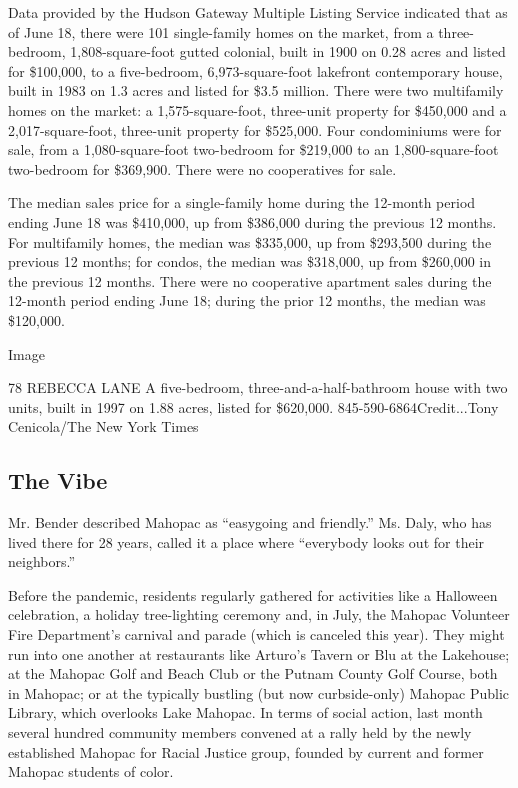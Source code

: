 Data provided by the Hudson Gateway Multiple Listing Service indicated
that as of June 18, there were 101 single-family homes on the market,
from a three-bedroom, 1,808-square-foot gutted colonial, built in 1900
on 0.28 acres and listed for \$100,000, to a five-bedroom,
6,973-square-foot lakefront contemporary house, built in 1983 on 1.3
acres and listed for \$3.5 million. There were two multifamily homes on
the market: a 1,575-square-foot, three-unit property for \$450,000 and a
2,017-square-foot, three-unit property for \$525,000. Four condominiums
were for sale, from a 1,080-square-foot two-bedroom for \$219,000 to an
1,800-square-foot two-bedroom for \$369,900. There were no cooperatives
for sale.

The median sales price for a single-family home during the 12-month
period ending June 18 was \$410,000, up from \$386,000 during the
previous 12 months. For multifamily homes, the median was \$335,000, up
from \$293,500 during the previous 12 months; for condos, the median was
\$318,000, up from \$260,000 in the previous 12 months. There were no
cooperative apartment sales during the 12-month period ending June 18;
during the prior 12 months, the median was \$120,000.

Image

78 REBECCA LANE \textbar{} A five-bedroom, three-and-a-half-bathroom
house with two units, built in 1997 on 1.88 acres, listed for \$620,000.
845-590-6864Credit...Tony Cenicola/The New York Times

\hypertarget{the-vibe}{%
\subsection{The Vibe}\label{the-vibe}}

Mr. Bender described Mahopac as ``easygoing and friendly.'' Ms. Daly,
who has lived there for 28 years, called it a place where ``everybody
looks out for their neighbors.''

Before the pandemic, residents regularly gathered for activities like a
Halloween celebration, a holiday tree-lighting ceremony and, in July,
the Mahopac Volunteer Fire Department's carnival and parade (which is
canceled this year). They might run into one another at restaurants like
Arturo's Tavern or Blu at the Lakehouse; at the Mahopac Golf and Beach
Club or the Putnam County Golf Course, both in Mahopac; or at the
typically bustling (but now curbside-only) Mahopac Public Library, which
overlooks Lake Mahopac. In terms of social action, last month several
hundred community members convened at a rally held by the newly
established Mahopac for Racial Justice group, founded by current and
former Mahopac students of color.

